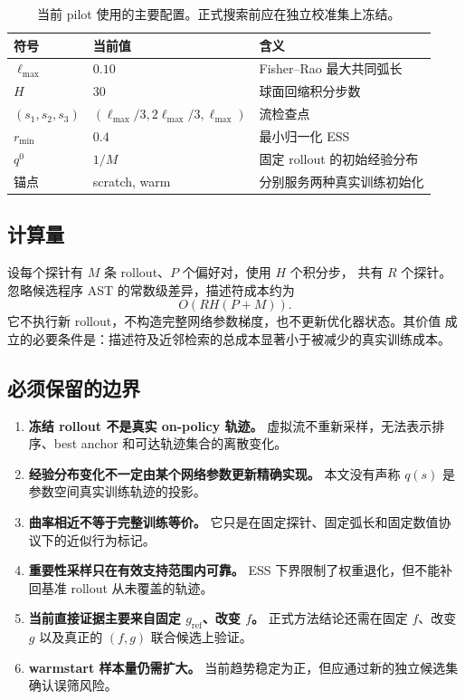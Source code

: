 \documentclass[UTF8,11pt]{ctexart}
\begin{document}
\begin{table}[h]
\centering
\caption{当前 pilot 使用的主要配置。正式搜索前应在独立校准集上冻结。}
\begin{tabular}{lll}
\toprule
符号 & 当前值 & 含义\\
\midrule
\(\ell_{\max}\) & \(0.10\) & Fisher--Rao 最大共同弧长\\
\(H\) & \(30\) & 球面回缩积分步数\\
\((s_1,s_2,s_3)\) &
\((\ell_{\max}/3,2\ell_{\max}/3,\ell_{\max})\) & 流检查点\\
\(r_{\min}\) & \(0.4\) & 最小归一化 ESS\\
\(q^0\) & \(1/M\) & 固定 rollout 的初始经验分布\\
锚点 & scratch, warm & 分别服务两种真实训练初始化\\
\bottomrule
\end{tabular}
\end{table}

\subsection{计算量}

设每个探针有 \(M\) 条 rollout、\(P\) 个偏好对，使用 \(H\) 个积分步，
共有 \(R\) 个探针。忽略候选程序 AST 的常数级差异，描述符成本约为
\[
    O\!\left(RH(P+M)\right).
\]
它不执行新 rollout，不构造完整网络参数梯度，也不更新优化器状态。其价值
成立的必要条件是：描述符及近邻检索的总成本显著小于被减少的真实训练成本。

\subsection{必须保留的边界}

\begin{enumerate}
    \item \textbf{冻结 rollout 不是真实 on-policy 轨迹。}
    虚拟流不重新采样，无法表示排序、best anchor 和可达轨迹集合的离散变化。
    \item \textbf{经验分布变化不一定由某个网络参数更新精确实现。}
    本文没有声称 \(q(s)\) 是参数空间真实训练轨迹的投影。
    \item \textbf{曲率相近不等于完整训练等价。}
    它只是在固定探针、固定弧长和固定数值协议下的近似行为标记。
    \item \textbf{重要性采样只在有效支持范围内可靠。}
    ESS 下界限制了权重退化，但不能补回基准 rollout 从未覆盖的轨迹。
    \item \textbf{当前直接证据主要来自固定 \(g_{\mathrm{ref}}\)、改变 \(f\)。}
    正式方法结论还需在固定 \(f\)、改变 \(g\) 以及真正的 \((f,g)\)
    联合候选上验证。
    \item \textbf{warmstart 样本量仍需扩大。}
    当前趋势稳定为正，但应通过新的独立候选集确认误筛风险。
\end{enumerate}
\end{document}
